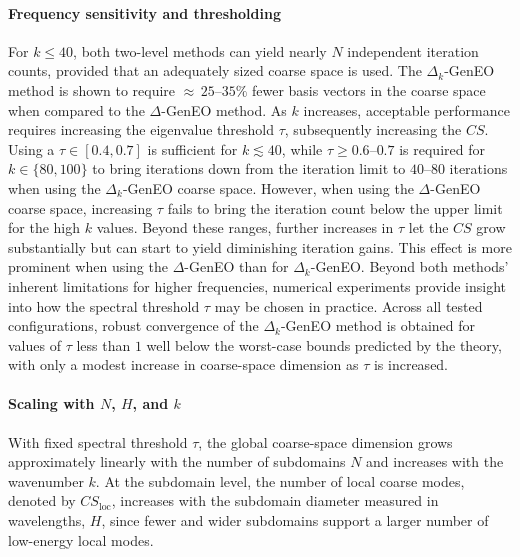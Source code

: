 \documentclass[preprint,3p,times]{elsarticle}
\theoremstyle{definition}
\numberwithin{equation}{section}
\begin{document}
{\paragraph{Frequency sensitivity and thresholding}
For $k \le 40$, both two-level methods can yield nearly $N$ independent iteration counts, provided that an adequately sized coarse space is used. 
The $\Delta_k$-GenEO method is shown to require $\approx\,25$--$35\%$ fewer basis vectors in the coarse space when compared to the $\Delta$-GenEO method.
As $k$ increases, acceptable performance requires increasing the eigenvalue threshold $\tau$, subsequently increasing the $CS$. 
Using a $\tau\in[0.4,0.7]$ is sufficient for $k\lesssim 40$, while $\tau\ge 0.6$--$0.7$ is required for $k\in\{80,100\}$ 
to bring iterations down from the iteration limit to $40$--$80$ iterations when using the $\Delta_k$-GenEO coarse space. 
However, when using the $\Delta$-GenEO coarse space, increasing $\tau$ fails to bring the iteration count 
below the upper limit for the high $k$ values. 
Beyond these ranges, further increases in $\tau$ let the $CS$ grow substantially but can start to yield diminishing iteration gains. 
This effect is more prominent when using the $\Delta$-GenEO than for $\Delta_k$-GenEO.
{
Beyond both methods' inherent limitations for higher frequencies, numerical experiments provide insight into how the spectral threshold $\tau$ may be chosen in practice. 
Across all tested configurations, robust convergence of the $\Delta_k$-GenEO method is obtained for values of $\tau$ less than $1$ well below the worst-case bounds predicted by the theory, with only a modest increase in coarse-space dimension as $\tau$ is increased.
}
{\paragraph{Scaling with \texorpdfstring{$N$}{N}, \texorpdfstring{$H$}{H}, and \texorpdfstring{$k$}{k}}
With fixed spectral threshold $\tau$, the global coarse-space dimension grows approximately linearly 
with the number of subdomains $N$ and increases with the wavenumber $k$. 
At the subdomain level, the number of local coarse modes, denoted by $CS_{\mathrm{loc}}$, increases with the subdomain diameter 
measured in wavelengths, $H$, since fewer and wider subdomains support a larger number of low-energy local modes.}

}
\end{document}

